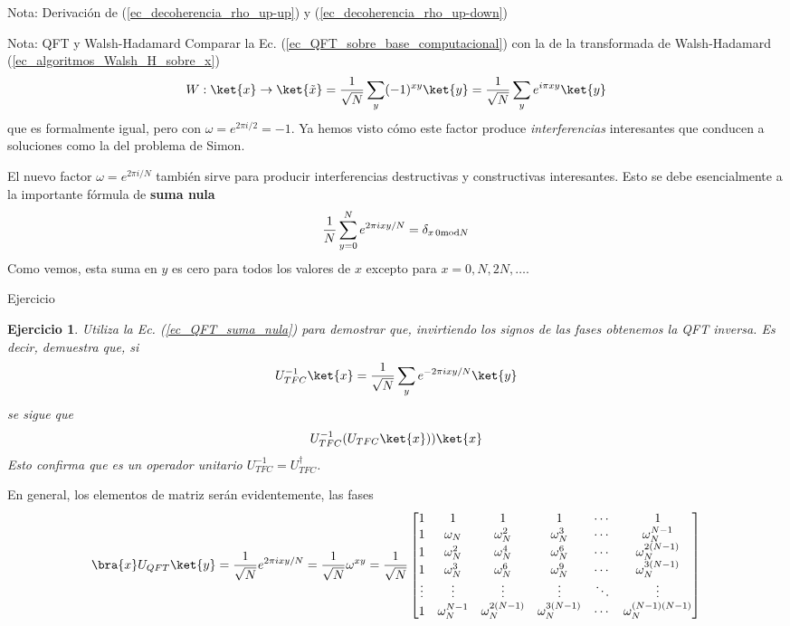 \documentclass[a4paper,11pt]{book} %
\newtheorem{ejercicio_contador}{Ejercicio}
\newcommand{\Ejercicio}[1]{
		\begin{mybox_gray}{Ejercicio} 
			\begin{ejercicio_contador}
				 #1 
			\end{ejercicio_contador} 
		\end{mybox_gray}
	}
\numberwithin{equation}{chapter}
\begin{document}
\begin{mybox_blue}{Nota: Derivación de (\ref{ec_decoherencia_rho_up-up}) y  (\ref{ec_decoherencia_rho_up-down})}
	\begin{mybox_blue}{Nota: QFT y Walsh-Hadamard}
	Comparar la Ec. (\ref{ec_QFT_sobre_base_computacional}) con la de la transformada de Walsh-Hadamard (\ref{ec_algoritmos_Walsh_H_sobre_x})
	$$
	W: \ket{x} \to \ket{\tilde x} =  \frac{1}{\sqrt{N}}\sum_{y}(-1)^{xy}\ket{y} =   \frac{1}{\sqrt{N}}\sum_{y} e^{i\pi   xy} \ket{y} 
	$$
	que es formalmente igual, pero con $\omega = e^{2\pi i/2} = -1$.
    Ya hemos visto cómo este factor produce \textit{interferencias} interesantes que conducen a soluciones como la del problema de Simon. 
	\end{mybox_blue}

El nuevo factor $\omega = e^{2\pi i/N}$ también sirve para producir interferencias destructivas y constructivas interesantes. Esto se debe esencialmente a la importante fórmula de \textbf{suma nula}
	\begin{equation} \label{ec_QFT_suma_nula}
	\frac{1}{N} \sum_{y=0}^{N} e^{2\pi i xy/N} = \delta_{x \, 0 {\rm mod}N}
	\end{equation}
Como vemos, esta suma en $y$ es cero para todos los valores de $x$ excepto para $x = 0, N, 2N, \dots$.

	\Ejercicio{Utiliza la Ec. (\ref{ec_QFT_suma_nula}) para demostrar que, invirtiendo los signos de las fases obtenemos la QFT inversa. Es decir, demuestra que, si  
	$$
	U^{-1}_{TFC}\ket{x}  =  \frac{1}{\sqrt{N}}\sum_{y} e^{-2\pi i  xy /N} \ket{y} 
	$$
	se sigue que     
	$$
	U_{TFC}^{-1}(U_{TFC} \ket{x}) ) \ket{x}
	$$
	Esto confirma que es un operador unitario $U_{TFC}^{-1} = U_{TFC}^\dagger$.
	}

En general, los elementos de matriz serán evidentemente, las fases
	\begin{equation*}
	\bra{x} U_{QFT} \ket{y} =  \frac{1}{\sqrt{N}} e^{2\pi i  x y/N} =\frac{1}{\sqrt{N}} \omega^{xy}
 = \frac{1}{\sqrt{N}} \begin{bmatrix}
1&1&1&1&\cdots &1 \\
1&\omega_N&\omega_N^2&\omega_N^3&\cdots&\omega_N^{N-1} \\
1&\omega_N^2&\omega_N^4&\omega_N^6&\cdots&\omega_N^{2(N-1)}\\ 1&\omega_N^3&\omega_N^6&\omega_N^9&\cdots&\omega_N^{3(N-1)}\\
\vdots&\vdots&\vdots&\vdots&\ddots&\vdots\\
1&\omega_N^{N-1}&\omega_N^{2(N-1)}&\omega_N^{3(N-1)}&\cdots&\omega_N^{(N-1)(N-1)}
\end{bmatrix}
	\end{equation*}
	

\end{mybox_blue}
\end{document}
